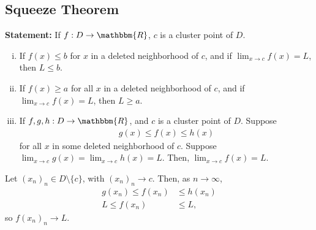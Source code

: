 \documentclass[10pt]{extarticle}
\newcommand{\R}{\mathbbm{R}}
\begin{document}
  \subsection{Squeeze Theorem}%
    \textbf{Statement:} If $f:D\rightarrow \R$, $c$ is a cluster point of $D$.
    \begin{enumerate}[(i)]
      \item If $f(x) \leq b$ for $x$ in a deleted neighborhood of $c$, and if $\lim_{x\rightarrow c}f(x) = L$, then $L \leq b$.
      \item If $f(x) \geq a$ for all $x$ in a deleted neighborhood of $c$, and if $\lim_{x\rightarrow c}f(x) = L$, then $L \geq a$.
      \item If $f,g,h: D\rightarrow \R$, and $c$ is a cluster point of $D$. Suppose
        \begin{align*}
          g(x) \leq f(x) \leq h(x)
        \end{align*}
        for all $x$ in some deleted neighborhood of $c$. Suppose $\lim_{x\rightarrow c}g(x) = \lim_{x\rightarrow c}h(x) = L$. Then, $\lim_{x\rightarrow c}f(x) = L$.
    \end{enumerate}
    
    \begin{description}[font=\normalfont]
      \item[Proof of (iii)] Let $(x_n)_n\in D\setminus \{c\}$, with $(x_n)_n \rightarrow c$. Then, as $n\rightarrow \infty$,
        \begin{align*}
          g(x_n) \leq f(x_n) &\leq h(x_n)\\
          L \leq f(x_n) &\leq L,
        \end{align*}
        so $f(x_n)_n \rightarrow L$.
    \end{description}
\end{document}
